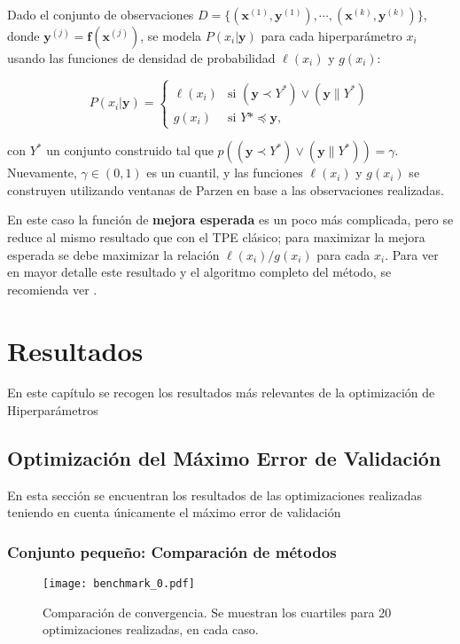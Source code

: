 Dado el conjunto de observaciones $D = \{(\textbf{x}^{(1)},\textbf{y}^{(1)}), \cdots, (\textbf{x}^{(k)},\textbf{y}^{(k)}) \}$, donde $\textbf{y}^{(j)} = \textbf{f}(\textbf{x}^{(j)})$, se modela $P(x_i|\textbf{y})$ para cada hiperparámetro $x_i$ usando las funciones de densidad de probabilidad $\ell(x_i)$ y $g(x_i)$:


\begin{equation}
\label{eq:motpe}
P(x_i|\textbf{y}) =
	\begin{cases}
		\ell (x_i) & \text{si } (\textbf{y} \prec Y^*) \vee (\textbf{y} \| Y^*) \\
		g(x_i) & \text{si } Y* \preceq \textbf{y},
	\end{cases}
\end{equation}

con $Y^*$ un conjunto construido tal que $p((\textbf{y} \prec Y^*) \vee (\textbf{y} \| Y^*)) = \gamma$. Nuevamente, $\gamma \in (0,1)$ es un cuantil, y las funciones $\ell(x_i)$ y $g(x_i)$ se construyen utilizando ventanas de Parzen en base a las observaciones realizadas.

En este caso la función de \textbf{mejora esperada} es un poco más complicada, pero se reduce al mismo resultado que con el TPE clásico; para maximizar la mejora esperada se debe maximizar la relación $\ell(x_i)/g(x_i)$ para cada $x_i$. Para ver en mayor detalle este resultado y el algoritmo completo del método, se recomienda ver \cite{10.1613/jair.1.13188}.



\chapter{Resultados}

En este capítulo se recogen los resultados más relevantes de la optimización de Hiperparámetros
\section{Optimización del Máximo Error de Validación}
En esta sección se encuentran los resultados de las optimizaciones realizadas teniendo en cuenta únicamente el máximo error de validación
\subsection{Conjunto pequeño: Comparación de métodos}


\begin{figure}[h!]
\centering
\texttt{[image: benchmark\_0.pdf]}
\caption{Comparación de convergencia. Se muestran los cuartiles para 20 optimizaciones realizadas, en cada caso.}
\label{fig:bench0}
\end{figure}

